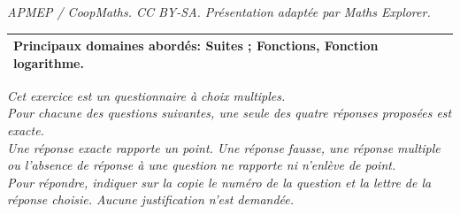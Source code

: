 \documentclass[10pt]{article}
\begin{document}
\noindent\textit{APMEP / CoopMaths. CC BY-SA. Présentation adaptée par Maths Explorer.}\par\medskip
\medskip

\begin{tabularx}{\linewidth}{|X|}\hline
\textbf{Principaux domaines abordés:} Suites ; Fonctions, Fonction logarithme.\\ \hline
\end{tabularx}

\medskip

\emph{Cet exercice est un questionnaire à choix multiples.\\
Pour chacune des questions suivantes, une seule des quatre réponses proposées
est exacte.\\
Une réponse exacte rapporte un point. Une réponse fausse, une réponse multiple ou
l'absence de réponse à une question ne rapporte ni n'enlève de point.\\
Pour répondre, indiquer sur la copie le numéro de la question et la lettre de la réponse choisie. Aucune justification n'est demandée.}
\end{document}
